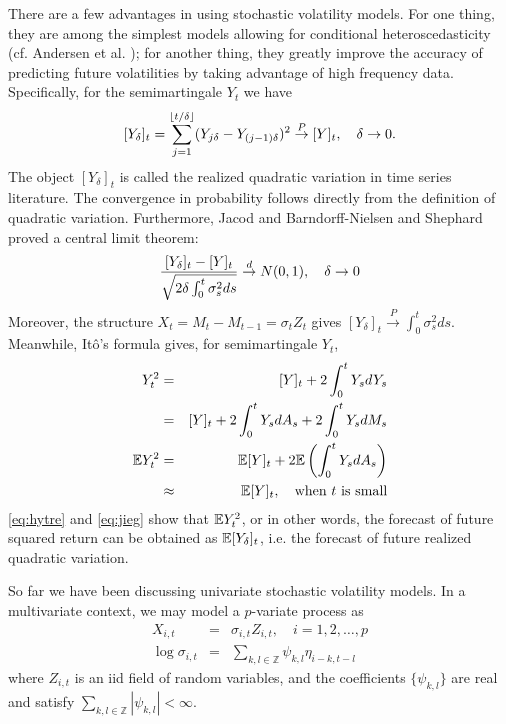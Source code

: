 There are a few advantages in using stochastic volatility models. For
one thing, they are among the simplest models allowing for conditional
heteroscedasticity (cf. Andersen et
al. \cite{andersen:davis:kreiss:mikosch:2009}); for another thing,
they greatly improve the accuracy of predicting future volatilities
by taking advantage of high frequency data. Specifically, for the
semimartingale $Y_t$ we have
\begin{equation}
  \label{eq:jieg}
  [Y_{\delta}]_t
  =
  \sum_{j=1}^{\lfloor t/\delta\rfloor}
  (Y_{j \delta} - Y_{(j-1)\delta})^2
  \overset{P}{\to} [Y]_t,
  \quad
  \delta \to 0.
\end{equation}
The object $[Y_\delta]_t$ is called the realized quadratic variation
in time series literature.
The convergence in probability follows directly from the definition of
quadratic variation.
Furthermore, Jacod \cite{jacod:1994} and
Barndorff-Nielsen and Shephard \cite{barndorff:shephard:2002} proved a
central limit theorem:
\[
  {[Y_\delta]_t - [Y]_t \over \sqrt{2 \delta \int_0^t \sigma_s^2 ds}}
  \overset{d}{\to} N(0, 1),
  \quad \delta \to 0
\]
Moreover, the structure $X_t = M_{t} - M_{t-1} = \sigma_t Z_t$ gives
$[Y_\delta]_t \overset{P}{\to} \int_0^t \sigma_s^2 ds$. Meanwhile,
It\^o's formula gives, for semimartingale $Y_t$,
\begin{eqnarray}
  Y_t^2 &=& [Y]_t + 2 \int_0^t Y_s d Y_s \nonumber \\
  &=& [Y]_t + 2 \int_0^t Y_s dA_s + 2 \int_0^t Y_s dM_s \nonumber \\
  \mathbb{E} Y_t^2 &=& \mathbb{E} [Y]_t + 2 \mathbb{E} \left( \int_0^t Y_s dA_s \right) \nonumber\\
  &\approx& \mathbb{E} [Y]_t, \quad \text{when $t$ is small} \label{eq:hytre}
\end{eqnarray}
\eqref{eq:hytre} and \eqref{eq:jieg} show that $\mathbb{E} Y_t^2$, or in other
words, the forecast of future squared return can be obtained as
$\mathbb{E} [Y_\delta]_t$, i.e. the forecast of future realized quadratic
variation.

So far we have been discussing univariate stochastic volatility
models. In a multivariate context, we may model a $p$-variate process
as
\begin{eqnarray*}
  X_{i,t} &=& \sigma_{i,t} Z_{i,t}, \quad i = 1,2,\dots,p\\
  \log \sigma_{i, t}
  &=&
  \sum_{k,l \in \mathbb Z} \psi_{k,l} \eta_{i-k, t-l}
\end{eqnarray*}
where $Z_{i,t}$ is an iid field of random variables, and the
coefficients $\{\psi_{k,l}\}$ are real and satisfy
$\sum_{k, l \in \mathbb Z} |\psi_{k,l}| < \infty$.


